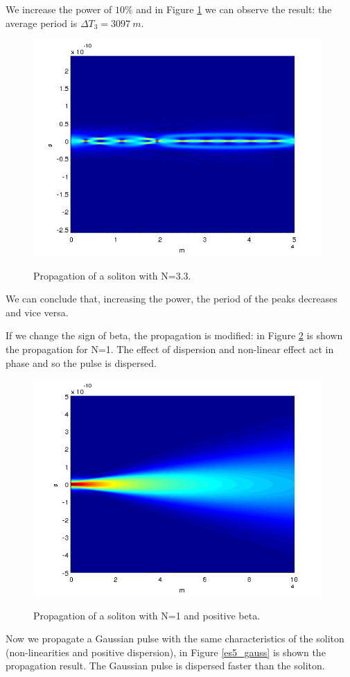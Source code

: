 \documentclass[a4paper,10pt]{report}
\begin{document}
We increase the power of $10 \%$ and in Figure \ref{es5_N33} we can observe the result: the average period is $\Delta T_3= 3097 \ m$.

\begin{figure}[!ht]
  \centering
  \includegraphics[width=11cm]{es5_N33.png}\\
  \caption{Propagation of a soliton with N=3.3.}
  \label{es5_N33}
\end{figure}
We can conclude that, increasing the power, the period of the peaks decreases and vice versa.

If we change the sign of beta, the propagation is modified: in Figure \ref{es5_positivebeta} is shown the propagation for N=1.
The effect of dispersion and non-linear effect act in phase and so the pulse is dispersed.

\begin{figure}[!ht]
  \centering
  \includegraphics[width=11cm]{es5_positivebeta.png}\\
  \caption{Propagation of a soliton with N=1 and positive beta.}
  \label{es5_positivebeta}
\end{figure}
\newpage
Now we propagate a Gaussian pulse with the same characteristics of the soliton (non-linearities and positive dispersion),
in Figure \ref{es5_gauss} is shown the propagation result. The Gaussian pulse is dispersed faster than the soliton.
\end{document}
